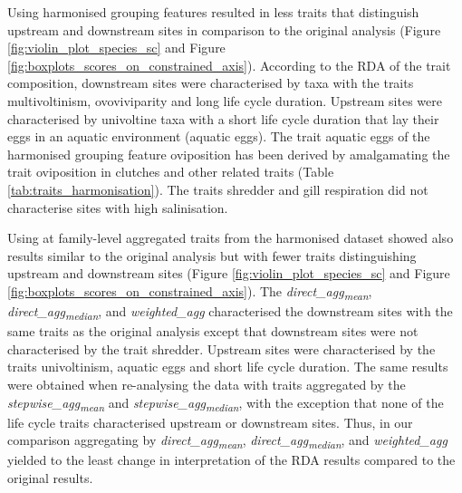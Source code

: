 \documentclass{article}
\begin{document}
Using harmonised grouping features resulted in less traits that distinguish upstream and downstream sites in comparison to the original analysis (Figure \ref{fig:violin_plot_species_sc} and Figure \ref{fig:boxplots_scores_on_constrained_axis}). According to the RDA of the trait composition, downstream sites were characterised by taxa with the traits multivoltinism, ovoviviparity and long life cycle duration. Upstream sites were characterised by univoltine taxa with a short life cycle duration that lay their eggs in an aquatic environment (aquatic eggs). The trait aquatic eggs of the harmonised grouping feature oviposition has been derived by amalgamating the trait oviposition in clutches and other related traits (Table \ref{tab:traits_harmonisation}). The traits shredder and gill respiration did not characterise sites with high salinisation.

Using at family-level aggregated traits from the harmonised dataset showed also results similar to the original analysis but with fewer traits distinguishing upstream and downstream sites (Figure \ref{fig:violin_plot_species_sc} and Figure \ref{fig:boxplots_scores_on_constrained_axis}). The \textit{direct\_agg\textsubscript{mean}}, \textit{direct\_agg\textsubscript{median}}, and \textit{weighted\_agg} 
characterised the downstream sites with the same traits as the original analysis except that downstream sites were not characterised by the trait shredder. Upstream sites were characterised by the traits univoltinism, aquatic eggs and short life cycle duration. The same results were obtained when re-analysing the data with traits aggregated by the \textit{stepwise\_agg\textsubscript{mean}} and \textit{stepwise\_agg\textsubscript{median}}, with the exception that none of the life cycle traits characterised upstream or downstream sites. Thus, in our comparison aggregating by \textit{direct\_agg\textsubscript{mean}}, \textit{direct\_agg\textsubscript{median}}, and \textit{weighted\_agg} yielded to the least change in interpretation of the RDA results compared to the original results.
\end{document}
